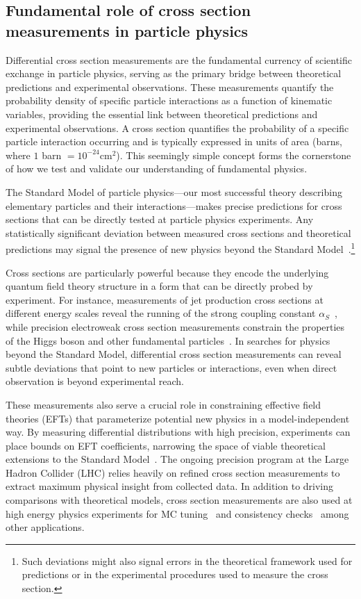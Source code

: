\begin{definition}
\section{Fundamental role of cross section measurements in particle physics}

Differential cross section measurements are the fundamental currency of scientific exchange in particle physics, serving as the primary bridge between theoretical predictions and experimental observations.
%
These measurements quantify the probability density of specific particle interactions as a function of kinematic variables, providing the essential link between theoretical predictions and experimental observations.
%
 A cross section quantifies the probability of a specific particle interaction occurring and is typically expressed in units of area (barns, where $1$ barn $= 10^{-24} \mathrm{cm}^2$). This seemingly simple concept forms the cornerstone of how we test and validate our understanding of fundamental physics.
 
The Standard Model of particle physics---our most successful theory describing elementary particles and their interactions---makes precise predictions for cross sections that can be directly tested at particle physics experiments.
%
Any statistically significant deviation between measured cross sections and theoretical predictions may signal the presence of new physics beyond the Standard Model~\cite{particle_data_group_review_2022}.\footnote{Such deviations might also signal errors in the theoretical framework used for predictions or in the experimental procedures used to measure the cross section.
} 

Cross sections are particularly powerful because they encode the underlying quantum field theory structure in a form that can be directly probed by experiment.
%
For instance, measurements of jet production cross sections at different energy scales reveal the running of the strong coupling constant \(\alpha_S\)~\cite{chiefa_parton_2025}, while precision electroweak cross section measurements constrain the properties of the Higgs boson and other fundamental particles~\cite{noauthor_precision_2006}.
%
In searches for physics beyond the Standard Model, differential cross section measurements can reveal subtle deviations that point to new particles or interactions, even when direct observation is beyond experimental reach.

These measurements also serve a crucial role in constraining effective field theories (EFTs) that parameterize potential new physics in a model-independent way.
%
By measuring differential distributions with high precision, experiments can place bounds on EFT coefficients, narrowing the space of viable theoretical extensions to the Standard Model~\cite{contino_validity_2016}.
%
The ongoing precision program at the Large Hadron Collider (LHC) relies heavily on refined cross section measurements to extract maximum physical insight from collected data.
%
In addition to driving comparisons with theoretical models, cross section measurements are also used at high energy physics experiments for MC tuning~\cite{albert_antares_2025} and consistency checks~\cite{buckley_constraints_2025} among other applications.


\end{definition}
